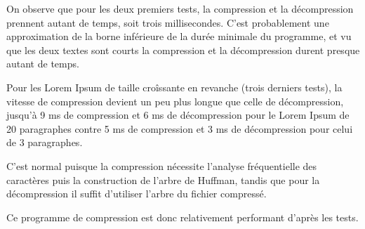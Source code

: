 \documentclass [a4paper,11pt] {report}
\begin{document}
On observe que pour les deux premiers tests, la compression et la décompression prennent autant de temps, soit trois millisecondes. C'est probablement une approximation de la borne inférieure de la durée minimale du programme, et vu que les deux textes sont courts la compression et la décompression durent presque autant de temps.

Pour les Lorem Ipsum de taille croîssante en revanche (trois derniers tests), la vitesse de compression devient un peu plus longue que celle de décompression, jusqu'à 9 ms de compression et 6 ms de décompression pour le Lorem Ipsum de 20 paragraphes contre 5 ms de compression et 3 ms de décompression pour celui de 3 paragraphes.

C'est normal puisque la compression nécessite l'analyse fréquentielle des caractères puis la construction de l'arbre de Huffman, tandis que pour la décompression il suffit d'utiliser l'arbre du fichier compressé.

Ce programme de compression est donc relativement performant d'après les tests.
\end{document}
